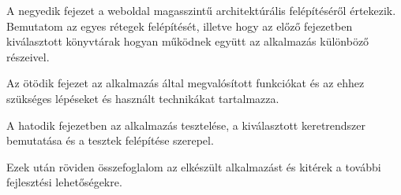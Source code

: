 A negyedik fejezet a weboldal magasszintű architektúrális felépítéséről értekezik. Bemutatom az egyes rétegek felépítését, illetve hogy
az előző fejezetben kiválasztott könyvtárak hogyan működnek együtt az alkalmazás különböző részeivel.

Az ötödik fejezet az alkalmazás által megvalósított funkciókat és az ehhez szükséges lépéseket és használt technikákat tartalmazza.

A hatodik fejezetben az alkalmazás tesztelése, a kiválasztott keretrendszer bemutatása és a tesztek felépítése szerepel.

Ezek után röviden összefoglalom az elkészült alkalmazást és kitérek a további fejlesztési lehetőségekre.
